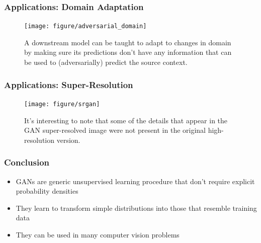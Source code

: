 \documentclass[10pt,mathserif]{beamer}
\begin{document}
\begin{frame}
  \frametitle{Applications: Domain Adaptation}
\begin{figure}[ht]
  \centering
  \texttt{[image: figure/adversarial\_domain]}
  \caption{A downstream model can be taught to adapt to changes in domain by
    making sure its predictions don't have any information that can be used to
    (adversarially) predict the source context.
    \label{fig:adapt} }
\end{figure}
\end{frame}

\begin{frame}
  \frametitle{Applications: Super-Resolution}
  \begin{figure}[ht]
  \centering
  \texttt{[image: figure/srgan]}
  \caption{It's interesting to note that some of the details that appear in the
    GAN super-resolved image were not present in the original high-resolution
    version.}
  \end{figure}
\end{frame}

\begin{frame}
  \frametitle{Conclusion}
  \begin{itemize}
    \item GANs are generic unsupervised learning procedure that don't require
      explicit probability densities
    \item They learn to transform simple distributions into those that resemble training data
    \item They can be used in many computer vision problems
  \end{itemize}
\end{frame}


\end{document}

